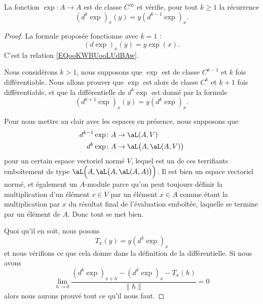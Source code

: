 \begin{proposition}      \label{PROPooTBDAooQouzSk}
    La fonction \( \exp\colon A\to A\) est de classe \(  C^{\infty}\) et vérifie, pour tout \( k\geq 1\) la récurrence
    \begin{equation}
        (d^k\exp)_x(y)=y(d^{k-1}\exp)_x.
    \end{equation}
\end{proposition}

\begin{proof}
    La formule proposée fonctionne avec \( k=1\) :
    \begin{equation}
        (d\exp)_x(y)=y\exp(x).
    \end{equation}
    C'est la relation \ref{EQooKWBUooLUdBAw}.

    Nous considérons \( k>1\), nous supposons que \( \exp\) est de classe \( C^{k-1}\) et \( k\) fois différentiable. Nous allons prouver que \( \exp\) est alors de classe \( C^k\) et \( k+1\) fois différentiable, et que la différentielle de \( d^k\exp\) est donné par la formule
    \begin{equation}
        (d^{k+1}\exp)_x(y)=y(d^{k}\exp)_x.
    \end{equation}

    Pour nous mettre au clair avec les espaces en présence, nous supposons que
    \begin{subequations}
        \begin{align}
            d^{k-1}\exp&\colon A\to \aL(A,V)\\
            d^{k}\exp&\colon A\to \aL\big( A,\aL(A,V) \big)
        \end{align}
    \end{subequations}
    pour un certain espace vectoriel normé \( V\), lequel est un de ces terrifiants emboîtement de type \( \aL\Big( A,\aL\big( A,\aL(A,A) \big) \Big)\). Il est bien un espace vectoriel normé, et également un \( A\)-module parce qu'on peut toujours définir la multiplication d'un élément \( v\in V\) par un élément \(x\in A\) comme étant la multiplication par \( x\) du résultat final de l'évaluation emboîtée, laquelle se termine par un élément de \( A\). Donc tout se met bien.

    Quoi qu'il en soit, nous posons
    \begin{equation}
        T_x(y)=y(d^{k}\exp)_x
    \end{equation}
    et nous vérifions ce que cela donne dans la définition de la différentielle. Si nous avons
    \begin{equation}
        \lim_{h\to 0} \frac{ (d^k\exp)_{x+h}-(d^k\exp)_x-T_x(h) }{ \| h \| }=0
    \end{equation}
    alors nous aurons prouvé tout ce qu'il nous faut.


\end{proof}

